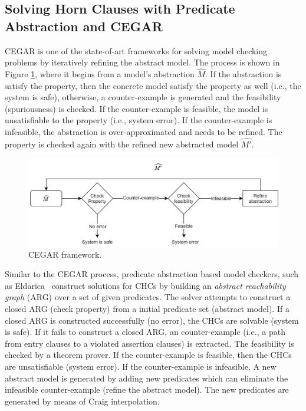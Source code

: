 \subsection{Solving Horn Clauses with Predicate Abstraction and CEGAR}

CEGAR \cite{10.1007/10722167_15} is one of the state-of-art frameworks for solving model checking problems by iteratively refining the abstract model.
%
The process is shown in Figure \ref{fig:CEGAR}, where it begins from a model's abstraction $\widehat{M}$.
%
If the abstraction is satisfy the property, then the concrete model satisfy the property as well (i.e., the system is safe), otherwise, a counter-example is generated and the feasibility (spuriousness) is checked. If the counter-example is feasible, the model is unsatisfiable to the property (i.e., system error).
%
If the counter-example is infeasible, the abstraction is over-approximated and needs to be refined.
%
The property is checked again with the refined new abstracted model $\widehat{M'}$.

\begin{figure}[t]
\centering
  \includegraphics[width=\textwidth]{figures/CEGAR}
  \caption{CEGAR framework.}\label{fig:CEGAR}
\end{figure}

Similar to the CEGAR process, predicate abstraction based model checkers, such as %
Eldarica~\cite{ruemmer2013disjunctive} construct solutions for CHCs by building an \emph{abstract reachability graph} (ARG) over a set of given predicates. 
%
The solver attempts to construct a closed ARG (check property) from a initial predicate set (abstract model).
%
If a closed ARG is constructed successfully (no error), the CHCs are solvable (system is safe).
%
If it fails to construct a closed ARG, an counter-example (i.e., a path from entry clauses to a violated assertion clauses) is extracted.
%
The feasibility is checked by a theorem prover.  If the counter-example is feasible, then the CHCs are unsatisfiable (system error).
%
If the counter-example is infeasible, A new abstract model is generated by adding new predicates which can eliminate the infeasible counter-example (refine the abstract model). The new predicates are generated by means of Craig interpolation.





